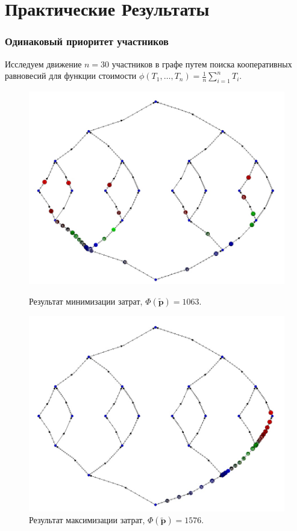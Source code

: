 \documentclass{beamer}
\begin{document}
\section{Практические Результаты}
\begin{frame}\frametitle{Одинаковый приоритет участников}
Исследуем движение $n = 30$ участников в графе путем поиска кооперативных равновесий для функции стоимости $\phi(T_1, \ldots, T_n) = \frac{1}{n}\sum\limits_{i = 1}^n T_i$.
\begin{figure}[H]
	\begin{center}
		\begin{minipage}[h]{0.35\linewidth}
			\includegraphics[width=1\linewidth]{imgs/average_good.jpg}
			\caption{Результат минимизации затрат, $\Phi(\widetilde{\textbf{p}}) = 1063$.}
		\end{minipage}
		\hfill
		\begin{minipage}[h]{0.35\linewidth}
			\includegraphics[width=1.\linewidth]{imgs/average_bad.jpg}
			\caption{Результат максимизации затрат, $\Phi(\widetilde{\textbf{p}}) = 1576$.}
		\end{minipage}
	\end{center}
\end{figure}


\end{frame}
\end{document}
